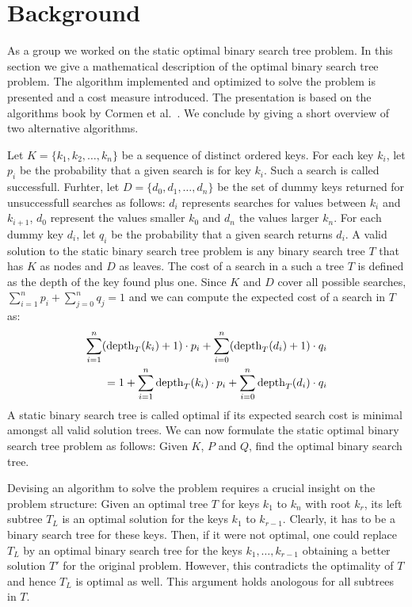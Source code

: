 \section{Background}

As a group we worked on the static optimal binary search tree problem.
In this section we give a mathematical description of the optimal binary
search tree problem. The algorithm implemented and optimized to solve the
problem is presented and a cost measure introduced. The presentation is
based on the algorithms book by Cormen et al.~\cite{MITBook}. We conclude
by giving a short overview of two alternative algorithms.

 Let $K = \{k_1, k_2, \dots, k_n\}$ be a sequence
of distinct ordered keys. For each key $k_i$, let $p_i$ be the probability
that a given search is for key $k_i$. Such a search is called successfull.
Furhter, let $D = \{d_0, d_1, \dots, d_n\}$ be the set of dummy keys
returned for unsuccessfull searches as follows: $d_i$ represents searches
for values between $k_i$ and $k_{i+1}$, $d_0$ represent the values smaller
$k_0$ and $d_n$ the values larger $k_n$. For each dummy key $d_i$, let
$q_i$ be the probability that a given search returns $d_i$.
A valid solution to the static binary search tree problem is any binary
search tree $T$ that has $K$ as nodes and $D$ as leaves.
The cost of a search in a such a tree $T$ is defined as the depth of the key
found plus one. Since $K$ and $D$ cover all possible searches,
$\sum_{i=1}^n p_i + \sum_{j=0}^n q_j = 1$ and we can compute the expected
cost of a search in $T$ as:
\begin{align}
  \sum_{i=1}^n (\operatorname{depth}_T(k_i) + 1) \cdot p_i
   + \sum_{i=0}^n (\operatorname{depth}_T(d_i) + 1) \cdot q_i
  \nonumber\\
  = 1 + \sum_{i=1}^n \operatorname{depth}_T(k_i) \cdot p_i
      + \sum_{i=0}^n \operatorname{depth}_T(d_i) \cdot q_i
  \label{eqn:cost}
\end{align}
A static binary search tree is called optimal if its expected search cost
is minimal amongst all valid solution trees.
We can now formulate the static optimal binary search tree problem as
follows: Given $K$, $P$ and $Q$, find the optimal binary search tree.

 Devising an algorithm to solve the problem requires a
crucial insight on the problem structure: Given an optimal tree $T$ for
keys $k_1$ to $k_n$ with root $k_r$, its left subtree $T_L$ is an optimal
solution for the keys $k_1$ to $k_{r-1}$. Clearly, it has to be a binary
search tree for these keys. Then, if it were not optimal, one could replace
$T_L$ by an optimal binary search tree for the keys $k_1,\dots,k_{r-1}$
obtaining a better solution $T'$ for the original problem. However, this
contradicts the optimality of $T$ and hence $T_L$ is optimal as well. This
argument holds anologous for all subtrees in $T$.

